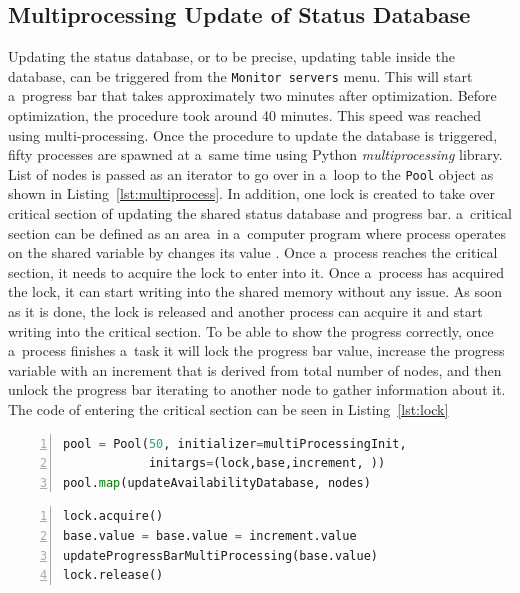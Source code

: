 {{{{\subsection{Multiprocessing Update of Status Database}
Updating the status database, or to be precise, updating table inside the database, can be triggered from the \texttt{Monitor servers} menu. This will start a~progress bar that takes approximately two minutes after optimization. Before optimization, the procedure took around 40 minutes. This speed was reached using multi-processing. Once the procedure to update the database is triggered, fifty processes are spawned at a~same time using Python \textit{multiprocessing} library. List of nodes is passed as an iterator to go over in a~loop to the \texttt{Pool} object as shown in Listing~\ref{lst:multiprocess}. In addition, one lock is created to take over critical section of updating the shared status database and progress bar. a~critical section can be defined as an area~in a~computer program where process operates on the shared variable by changes its value \cite{gebali2011algorithms}. Once a~process reaches the critical section, it needs to acquire the lock to enter into it. Once a~process has acquired the lock, it can start writing into the shared memory without any issue. As soon as it is done, the lock is released and another process can acquire it and start writing into the critical section. To be able to show the progress correctly, once a~process finishes a~task it will lock the progress bar value, increase the progress variable with an increment that is derived from total number of nodes, and then unlock the progress bar iterating to another node to gather information about it. The code of entering the critical section can be seen in  Listing~\ref{lst:lock}\\
 
{\noindent\begin{minipage}{\linewidth}
		\begin{lstlisting}[language=Python, numbers=left, label={lst:multiprocess}, caption={Creating a~multi-processing object with fifty processes, three shared variables and list of nodes as iterator.}, frame=single, showstringspaces=false, breaklines=true, keywordstyle=\color{blue},captionpos=b]
pool = Pool(50, initializer=multiProcessingInit,
		  	initargs=(lock,base,increment, ))
pool.map(updateAvailabilityDatabase, nodes)
		\end{lstlisting}
	\end{minipage} 

{\noindent\begin{minipage}{\linewidth}
		\begin{lstlisting}[language=Python, numbers=left, label={lst:lock}, caption=Entering a~critical section and acquiring lock., frame=single, showstringspaces=false, breaklines=true, keywordstyle=\color{blue},captionpos=b]
lock.acquire()
base.value = base.value = increment.value
updateProgressBarMultiProcessing(base.value)
lock.release()
		\end{lstlisting}
	\end{minipage} 

}}}}}}
